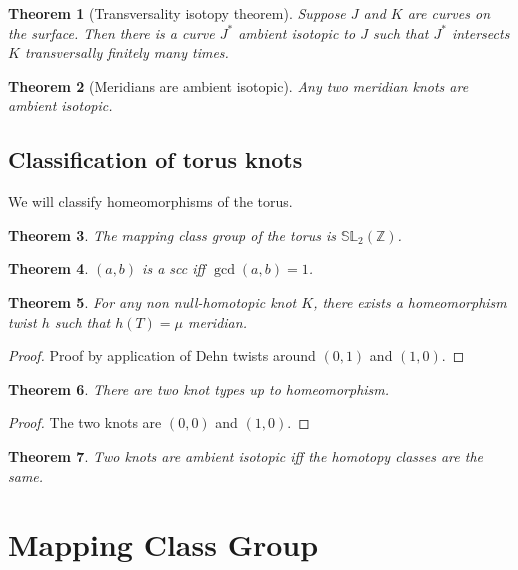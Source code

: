 \documentclass{article}
\newtheorem{theorem}{Theorem}
\theoremstyle{definition}
\numberwithin{theorem}{section}
\numberwithin{equation}{section}
\begin{document}
\begin{theorem}[Transversality isotopy theorem]
    Suppose $J$ and $K$ are curves on the surface. Then there is a curve $J^*$ ambient isotopic to $J$ such that $J^*$ intersects $K$ transversally finitely many times. 
\end{theorem}

\begin{theorem}[Meridians are ambient isotopic]
    Any two meridian knots are ambient isotopic.
\end{theorem}

\subsection{Classification of torus knots}

We will classify homeomorphisms of the torus.

\begin{theorem}
    The mapping class group of the torus is $\mathbb{SL}_2(\mathbb{Z})$.
\end{theorem}

\begin{theorem}
    $(a, b)$ is a scc iff $\gcd(a, b) = 1$. 
\end{theorem}

\begin{theorem}
    For any non null-homotopic knot $K$, there exists a homeomorphism twist $h$ such that $h(T) = \mu$ meridian.
\end{theorem}

\begin{proof}
    Proof by application of Dehn twists around $(0, 1)$ and $(1, 0)$. 
\end{proof}

\begin{theorem}
    There are two knot types up to homeomorphism.
\end{theorem}
\begin{proof}
    The two knots are $(0,0)$ and $(1, 0)$. 
\end{proof}

\begin{theorem}
    Two knots are ambient isotopic iff the homotopy classes are the same. 
\end{theorem}

\section{Mapping Class Group}
\end{document}
